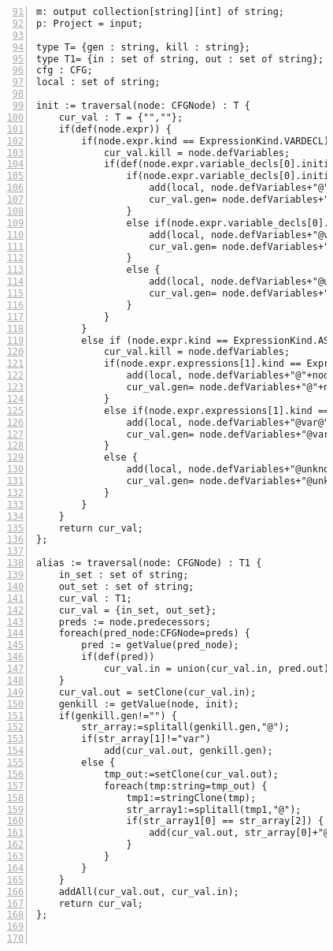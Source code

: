 \begin{figure}[ht!]
\begin{lstlisting}[numbers=left, tabsize=4, caption={Local must not alias},label={lst:lmna-code}, firstline = 91, firstnumber = 91] 
m: output collection[string][int] of string;
p: Project = input;

type T= {gen : string, kill : string};
type T1= {in : set of string, out : set of string};
cfg : CFG;
local : set of string;

init := traversal(node: CFGNode) : T {
	cur_val : T = {"",""};
	if(def(node.expr)) {
		if(node.expr.kind == ExpressionKind.VARDECL) {
			cur_val.kill = node.defVariables;
			if(def(node.expr.variable_decls[0].initializer)) {
				if(node.expr.variable_decls[0].initializer.kind == ExpressionKind.NEW) {
					add(local, node.defVariables+"@"+node.expr.variable_decls[0].initializer.new_type.qualified_name);
					cur_val.gen= node.defVariables+"@"+node.expr.variable_decls[0].initializer.new_type.qualified_name;
				}
				else if(node.expr.variable_decls[0].initializer.kind == ExpressionKind.VARACCESS) {
					add(local, node.defVariables+"@var@"+node.expr.variable_decls[0].initializer.variable);
					cur_val.gen= node.defVariables+"@var@"+node.expr.variable_decls[0].initializer.variable;
				}
				else {
					add(local, node.defVariables+"@unknown");
					cur_val.gen= node.defVariables+"@unknown";
				}
			}
		}
		else if (node.expr.kind == ExpressionKind.ASSIGN) {
			cur_val.kill = node.defVariables;
			if(node.expr.expressions[1].kind == ExpressionKind.NEW) {
				add(local, node.defVariables+"@"+node.expr.expressions[1].new_type.qualified_name);
				cur_val.gen= node.defVariables+"@"+node.expr.expressions[1].new_type.qualified_name;
			}
			else if(node.expr.expressions[1].kind == ExpressionKind.VARACCESS) {
				add(local, node.defVariables+"@var@"+node.expr.expressions[1].variable);
				cur_val.gen= node.defVariables+"@var@"+node.expr.expressions[1].variable;
			}
			else {
				add(local, node.defVariables+"@unknown");
				cur_val.gen= node.defVariables+"@unknown";
			}
		}
	}
	return cur_val;
};

alias := traversal(node: CFGNode) : T1 {
	in_set : set of string;
	out_set : set of string;
	cur_val : T1;
	cur_val = {in_set, out_set};
	preds := node.predecessors;
	foreach(pred_node:CFGNode=preds) {	
		pred := getValue(pred_node);
		if(def(pred))
			cur_val.in = union(cur_val.in, pred.out);
	}
	cur_val.out = setClone(cur_val.in);
	genkill := getValue(node, init);
	if(genkill.gen!="") {
		str_array:=splitall(genkill.gen,"@");
		if(str_array[1]!="var")
			add(cur_val.out, genkill.gen);
		else {
			tmp_out:=setClone(cur_val.out);
			foreach(tmp:string=tmp_out) {
				tmp1:=stringClone(tmp);
				str_array1:=splitall(tmp1,"@");
				if(str_array1[0] == str_array[2]) {
					add(cur_val.out, str_array[0]+"@"+str_array1[1]);
				}
			}
		}
	}
	addAll(cur_val.out, cur_val.in);
	return cur_val;
};



\end{lstlisting}
\end{figure}
